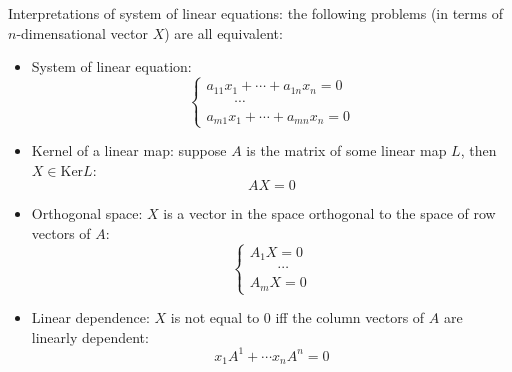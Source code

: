 \documentclass{report}
\begin{document}
Interpretations of system of linear equations: the following problems (in terms of $n$-dimensational vector $X$) are all equivalent:
\begin{itemize}
	\item System of linear equation: 
	\begin{equation}
	\left\{ \begin{array}{l} 
	a_{11} x_1 + \cdots + a_{1n} x_n = 0\\
	\qquad \cdots \\
	a_{m1} x_1 + \cdots + a_{mn} x_n = 0
	\end{array} 
	\right.
	\end{equation}
	
	\item Kernel of a linear map: suppose $A$ is the matrix of some linear map $L$, then $X \in \text{Ker}L$: 
	\begin{equation}
	AX = 0
	\end{equation}
	
	\item Orthogonal space: $X$ is a vector in the space orthogonal to the space of row vectors of $A$: 
	\begin{equation}
	\left\{ \begin{array}{l} 
	A_1 X = 0 \\
	\qquad \cdots \\
	A_m X = 0
	\end{array} 
	\right.	
	\end{equation}
	
	\item Linear dependence: $X$ is not equal to 0 iff the column vectors of $A$ are linearly dependent: 
	\begin{equation}
	x_1 A^1 + \cdots x_n A^n = 0	
	\end{equation}
\end{itemize}
\end{document}

